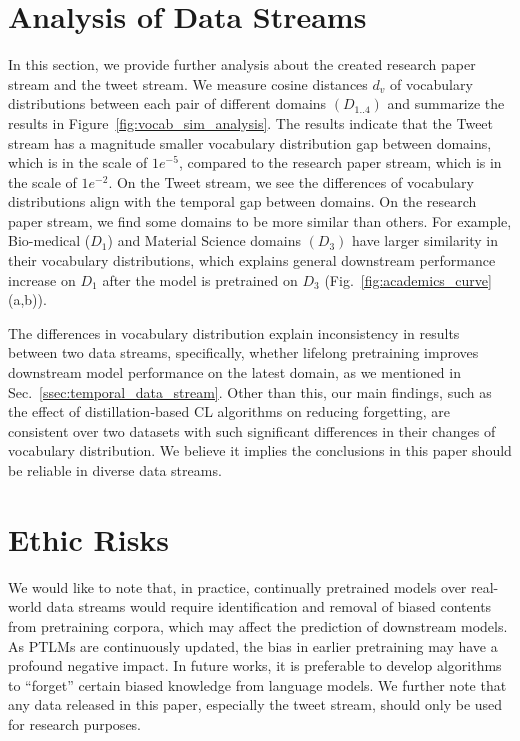 

\section{Analysis of Data Streams}
\label{apdx:analysis_data_streams}



In this section, we provide further analysis about the created research paper stream and the tweet stream. We measure cosine distances $d_v$ of vocabulary distributions between each pair of different domains $(D_{1..4})$ and summarize the results in Figure~\ref{fig:vocab_sim_analysis}. The results indicate that the Tweet stream has a magnitude smaller vocabulary distribution gap between domains, which is in the scale of $1e^{-5}$, compared to the research paper stream, which is in the scale of $1e^{-2}$. On the Tweet stream, we see the differences of vocabulary distributions align with the temporal gap between domains. On the research paper stream, we find some domains to be more similar than others. For example, Bio-medical ($D_1$) and Material Science domains $(D_3)$ have larger similarity in their vocabulary distributions, which explains general downstream performance increase on $D_1$ after the model is pretrained on $D_3$ (Fig.~\ref{fig:academics_curve} (a,b)).


The differences in vocabulary distribution explain inconsistency in results between two data streams, specifically, whether lifelong pretraining improves downstream model performance on the latest domain, as we mentioned in Sec.~\ref{ssec:temporal_data_stream}.
Other than this, our main findings, such as the effect of distillation-based CL algorithms on reducing forgetting, are consistent over two datasets with such significant differences in their changes of vocabulary distribution. We believe it implies the conclusions in this paper should be reliable in diverse data streams.




\section{Ethic Risks}
We would like to note that, in practice, continually pretrained models over real-world data streams would require identification and removal of biased contents from pretraining corpora, which may affect the prediction of downstream models. As PTLMs are continuously updated, the bias in earlier pretraining may have a profound negative impact. In future works, it is preferable to develop algorithms to ``forget'' certain biased knowledge from language models. We further note that any data released in this paper, especially the tweet stream, should only be used for research purposes.